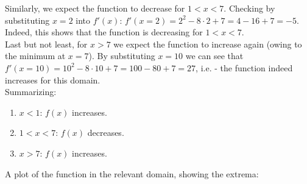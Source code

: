 \begin{enumerate}
{\begin{answer}
      Similarly, we expect the function to decrease for $1<x<7$. Checking by substituting $x=2$ into $f'\left( x \right)$: $f'\left( x=2 \right)=2^{2}-8\cdot2+7=4-16+7=-5$. Indeed, this shows that the function is decreasing for $1<x<7$.\\

      Last but not least, for $x>7$ we expect the function to increase again (owing to the minimum at $x=7$). By substituting $x=10$ we can see that $f'\left( x=10 \right)=10^{2}-8\cdot10+7=100-80+7=27$, i.e. - the function indeed increases for this domain.\\

      Summarizing:
      \begin{enumerate}
        \item $x<1$: $f\left( x \right)$ increases.
        \item $1<x<7$: $f\left( x \right)$ decreases.
        \item $x>7$: $f\left( x \right)$ increases.
      \end{enumerate}

      A plot of the function in the relevant domain, showing the extrema:
      \begin{figure}[H]
        \centering
      \end{figure}
    \end{answer}
  }\fi
\end{enumerate}

